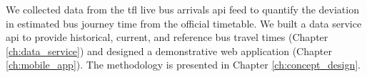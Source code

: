 \par We collected data from the \acrshort{tfl} live bus arrivals \acrshort{api} feed to quantify the deviation in estimated bus journey time from the official timetable. We built a data service \acrshort{api} to provide historical, current, and reference bus travel times (Chapter \ref{ch:data_service}) and designed a demonstrative web application (Chapter \ref{ch:mobile_app}). The methodology is presented in Chapter \ref{ch:concept_design}.




